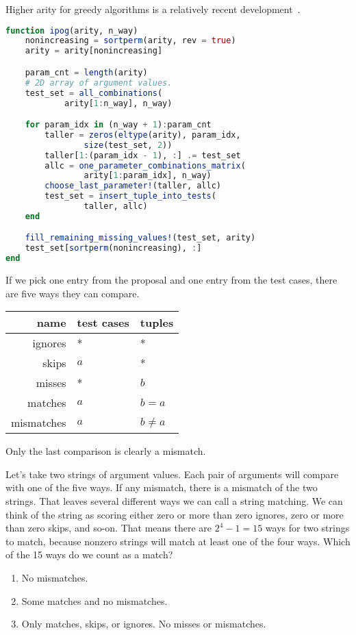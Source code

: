\documentclass{juliacon}
\begin{document}
Higher arity for greedy algorithms is a relatively recent development~\cite{Richard_Kuhn2008-ut}.

\vskip 6pt
\begin{lstlisting}[language=Julia]
function ipog(arity, n_way)
    nonincreasing = sortperm(arity, rev = true)
    arity = arity[nonincreasing]

    param_cnt = length(arity)
    # 2D array of argument values.
    test_set = all_combinations(
            arity[1:n_way], n_way)

    for param_idx in (n_way + 1):param_cnt
        taller = zeros(eltype(arity), param_idx,
                size(test_set, 2))
        taller[1:(param_idx - 1), :] .= test_set
        allc = one_parameter_combinations_matrix(
                arity[1:param_idx], n_way)
        choose_last_parameter!(taller, allc)
        test_set = insert_tuple_into_tests(
                taller, allc)
    end

    fill_remaining_missing_values!(test_set, arity)
    test_set[sortperm(nonincreasing), :]
end
\end{lstlisting}

\vskip 6pt
If we pick one entry from the proposal and one entry from the test cases, there are five ways they can compare.
\begin{center}
\begin{tabular}{rll}
name & test cases & tuples \\ \hline
ignores & * & * \\
skips & $a$ & * \\
misses & * & $b$ \\
matches & $a$ & $b=a$ \\
mismatches & $a$ & $b\ne a$
\end{tabular}
\end{center}
Only the last comparison is clearly a mismatch.

\vskip 6pt
Let's take two strings of argument values. Each pair of arguments will compare with one of the five ways. If any mismatch, there is a mismatch of the two strings. That leaves several different ways we can call a string matching. We can think of the string as scoring either zero or more than zero ignores, zero or more than zero skips, and so-on. That means there are $2^4-1 = 15$ ways for two strings to match, because nonzero strings will match at least one of the four ways. Which of the 15 ways do we count as a match?


\begin{enumerate}
   \item No mismatches.
   \item Some matches and no mismatches.
   \item Only matches, skips, or ignores. No misses or mismatches.
\end{enumerate}
\end{document}
